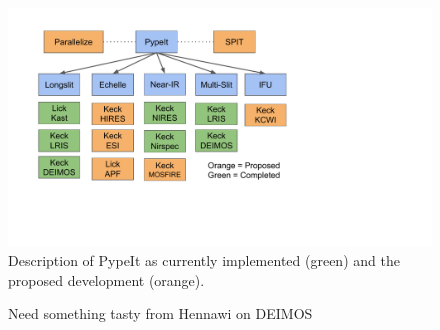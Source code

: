 \documentclass[12pt,preprint]{aastex}
\begin{document}
\begin{figure}
 \vskip -0.5in
\begin{center}
\includegraphics[scale=0.80]{code_sketch.pdf}
\end{center}
 \caption{\footnotesize  
Description of PypeIt as currently implemented (green)
and the proposed development (orange).
}\label{fig:PypeIt}
\end{figure}

\begin{figure}
 \vskip -0.5in
\begin{center}
\end{center}
 \caption{\footnotesize  
 Need something tasty from Hennawi on DEIMOS
}\label{fig:DEIMOS_example}
\end{figure}

\clearpage
\end{document}
